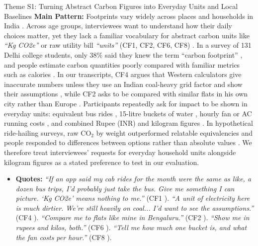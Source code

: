 \documentclass[12pt, a4paper]{article}
\begin{document}
\begin{semanticcard}{Theme S1: Turning Abstract Carbon Figures into Everyday Units and Local Baselines}
\textbf{Main Pattern:} Footprints vary widely across places and households in India \cite{lee2021}. Across age groups, interviewees want to understand how their daily choices matter, yet they lack a familiar vocabulary for abstract carbon units like \textit{``Kg CO2e''} or raw utility bill \textit{``units''} (CF1, CF2, CF6, CF8) \cite{cf1, cf2, cf6, cf8}. In a survey of 131 Delhi college students, only 38\% said they knew the term ``carbon footprint'' \cite{gandhi2025}, and people estimate carbon quantities poorly compared with familiar metrics such as calories \cite{grinstein2018}. In our transcripts, CF4 argues that Western calculators give inaccurate numbers unless they use an Indian coal-heavy grid factor and show their assumptions \cite{cf4}, while CF2 asks to be compared with similar flats in his own city rather than Europe \cite{cf2}. Participants repeatedly ask for impact to be shown in everyday units: equivalent bus rides \cite{cf1}, 15-litre buckets of water \cite{cf1, cf3, cf8}, hourly fan or AC running costs \cite{cf2, cf3, cf8}, and combined Rupee (INR) and kilogram figures \cite{cf6}. In hypothetical ride-hailing surveys, raw $\text{CO}_2$ by weight outperformed relatable equivalencies and people responded to differences between options rather than absolute values \cite{mohanty2023}. We therefore treat interviewees' requests for everyday household units alongside kilogram figures as a stated preference to test in our evaluation.
\begin{itemize}
    \item \textbf{Quotes:} \textit{``If an app said my cab rides for the month were the same as like, a dozen bus trips, I'd probably just take the bus. Give me something I can picture. `Kg CO2e' means nothing to me.''} (CF1 \cite{cf1}). \textit{``A unit of electricity here is much dirtier. We're still heavily on coal... I'd want to see the assumptions.''} (CF4 \cite{cf4}). \textit{``Compare me to flats like mine in Bengaluru.''} (CF2 \cite{cf2}). \textit{``Show me in rupees and kilos, both.''} (CF6 \cite{cf6}). \textit{``Tell me how much one bucket is, and what the fan costs per hour.''} (CF8 \cite{cf8}).
\end{itemize}
\end{semanticcard}
\end{document}
